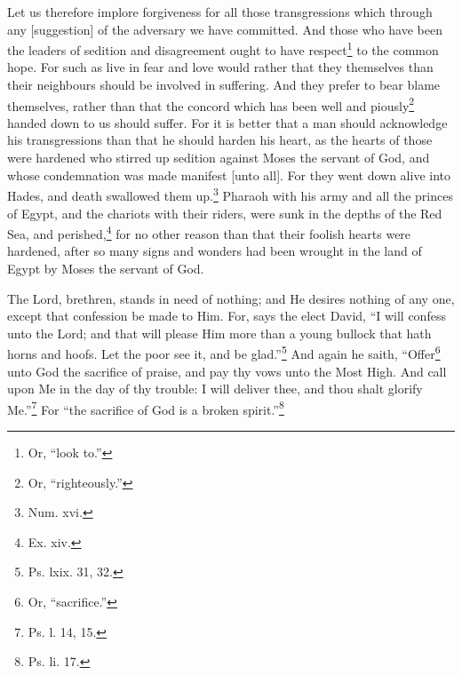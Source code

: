 Let us therefore implore forgiveness for all those transgressions which through any [suggestion] of the adversary we have committed. And those who have been the leaders of sedition and disagreement ought to have respect\footnote{Or, “look to.”} to the common hope. For such as live in fear and love would rather that they themselves than their neighbours should be involved in suffering. And they prefer to bear blame themselves, rather than that the concord which has been well and piously\footnote{Or, “righteously.”} handed down to us should suffer. For it is better that a man should acknowledge his transgressions than that he should harden his heart, as the hearts of those were hardened who stirred up sedition against Moses the servant of God, and whose condemnation was made manifest [unto all]. For they went down alive into Hades, and death swallowed them up.\footnote{Num. xvi.} Pharaoh with his army and all the princes of Egypt, and the chariots with their riders, were sunk in the depths of the Red Sea, and perished,\footnote{Ex. xiv.} for no other reason than that their foolish hearts were hardened, after so many signs and wonders had been wrought in the land of Egypt by Moses the servant of God.


The Lord, brethren, stands in need of nothing; and He desires nothing of any one, except that confession be made to Him. For, says the elect David, “I will confess unto the Lord; and that will please Him more than a young bullock that hath horns and hoofs. Let the poor see it, and be glad.”\footnote{Ps. lxix. 31, 32.} And again he saith, “Offer\footnote{Or, “sacrifice.”} unto God the sacrifice of praise, and pay thy vows unto the Most High. And call upon Me in the day of thy trouble: I will deliver thee, and thou shalt glorify Me.”\footnote{Ps. l. 14, 15.} For “the sacrifice of God is a broken spirit.”\footnote{Ps. li. 17.}


